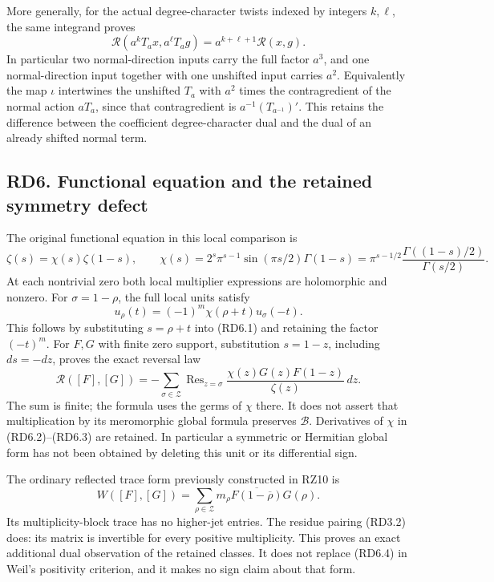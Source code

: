 More generally, for the actual degree-character twists indexed by
integers \(k,\ell\), the same integrand proves \[
\mathcal R(a^kT_ax,a^\ell T_ag)=a^{k+\ell+1}\mathcal R(x,g).
\tag{RD5.5}
\] In particular two normal-direction inputs carry the full factor
\(a^3\), and one normal-direction input together with one unshifted
input carries \(a^2\). Equivalently the map \(\iota\) intertwines the
unshifted \(T_a\) with \(a^2\) times the contragredient of the normal
action \(aT_a\), since that contragredient is \(a^{-1}(T_{a^{-1}})'\).
This retains the difference between the coefficient degree-character
dual and the dual of an already shifted normal term.

\subsection{RD6. Functional equation and the retained symmetry
defect}\label{rd6.-functional-equation-and-the-retained-symmetry-defect}

The original functional equation in this local comparison is \[
\zeta(s)=\chi(s)\zeta(1-s),\qquad
\chi(s)=2^s\pi^{s-1}\sin(\pi s/2)\Gamma(1-s)
=\pi^{s-1/2}\frac{\Gamma((1-s)/2)}{\Gamma(s/2)}.
\tag{RD6.1}
\] At each nontrivial zero both local multiplier expressions are
holomorphic and nonzero. For \(\sigma=1-\rho\), the full local units
satisfy \[
u_\rho(t)=(-1)^m\chi(\rho+t)u_\sigma(-t).
\tag{RD6.2}
\] This follows by substituting \(s=\rho+t\) into (RD6.1) and retaining
the factor \((-t)^m\). For \(F,G\) with finite zero support,
substitution \(s=1-z\), including \(ds=-dz\), proves the exact reversal
law \[
\mathcal R([F],[G])
=-\sum_{\sigma\in\mathscr Z}\operatorname{Res}_{z=\sigma}
\frac{\chi(z)G(z)F(1-z)}{\zeta(z)}\,dz.
\tag{RD6.3}
\] The sum is finite; the formula uses the germs of \(\chi\) there. It
does not assert that multiplication by its meromorphic global formula
preserves \(\mathcal B\). Derivatives of \(\chi\) in (RD6.2)--(RD6.3)
are retained. In particular a symmetric or Hermitian global form has not
been obtained by deleting this unit or its differential sign.

The ordinary reflected trace form previously constructed in RZ10 is \[
W([F],[G])=\sum_{\rho\in\mathscr Z}m_\rho
\overline{F(1-\overline\rho)}G(\rho).
\tag{RD6.4}
\] Its multiplicity-block trace has no higher-jet entries. The residue
pairing (RD3.2) does: its matrix is invertible for every positive
multiplicity. This proves an exact additional dual observation of the
retained classes. It does not replace (RD6.4) in Weil's positivity
criterion, and it makes no sign claim about that form.

